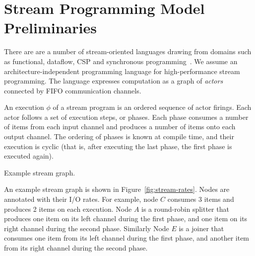 \section{Stream Programming Model Preliminaries}


There are are a number of stream-oriented languages drawing from
domains such as functional, dataflow, CSP and synchronous
programming~\cite{survey97}. We assume an architecture-independent
programming language for high-performance stream programming. The
language expresses computation as a graph of {\it actors} connected by
FIFO communication channels.

An execution $\phi$ of a stream program is an ordered sequence of
actor firings. Each actor follows a set of execution steps, or
phases. Each phase consumes a number of items from each input channel
and produces a number of items onto each output channel. The  ordering
of phases is known at compile time, and their execution is cyclic
(that is, after executing the last phase, the first phase is executed
again).


\begin{floatingfigure}[r]{0.4\textwidth}
\centering
{}
\vspace{-10pt}
\caption{{\small Example stream graph.
\protect\label{fig:stream-rates}}}
\end{floatingfigure}
An example stream graph is shown in Figure~\ref{fig:stream-rates}.
Nodes are annotated with their I/O rates. For example, node $C$
consumes 3 items and produces 2 items on each execution. Node $A$ is a
round-robin splitter that produces one item on its left channel during
the first phase, and one item on its right channel during the second
phase. Similarly Node $E$ is a joiner that consumes one item from its
left channel during the first phase, and another item from its right
channel during the second phase.


